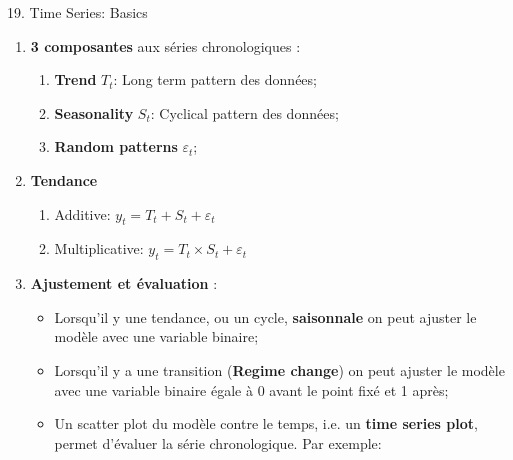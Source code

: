 \documentclass[12pt, titlepage, french]{report}
\begin{document}
\begin{CHPT_SUMM}{19. Time Series: Basics}
\begin{enumerate}
\begin{itemize}
		\end{itemize}
	\item[]	\textbf{3 composantes} aux séries chronologiques :
		\begin{enumerate}
		\item	\textbf{Trend} $T_{t}$: Long term pattern des données;
		\item	\textbf{Seasonality} $S_{t}$: Cyclical pattern des données;
		\item	\textbf{Random patterns} $\varepsilon_{t}$;
		\end{enumerate}	
	\item[]	\textbf{Tendance} 
		\begin{enumerate}
			\item	Additive: 		$y_{t} = T_{t} + S_{t} + \varepsilon_{t}$
			\item	Multiplicative: 	$y_{t} = T_{t} \times S_{t} + \varepsilon_{t}$
		\end{enumerate}
	\item[]	\textbf{Ajustement et évaluation} :
		\begin{itemize}
		\item	Lorsqu'il y une tendance, ou un cycle, \textbf{saisonnale} on peut ajuster le modèle avec une variable binaire;
		\item	Lorsqu'il y a une transition (\textbf{Regime change}) on peut ajuster le modèle avec une variable binaire égale à 0 avant le point fixé et 1 après;
		\item	Un scatter plot du modèle contre le temps, i.e. un \textbf{time series plot}, permet d'évaluer la série chronologique. 
		Par exemple:
		

\end{itemize}
\end{enumerate}
\end{CHPT_SUMM}
\end{document}
